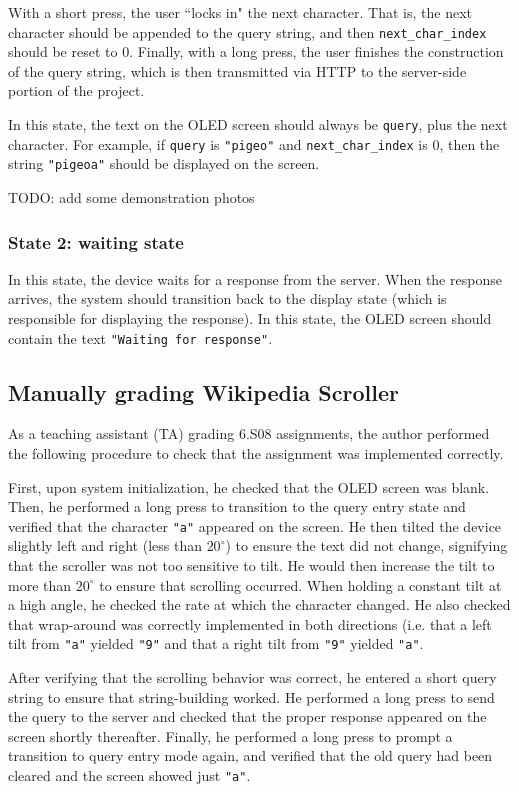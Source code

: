 \documentclass[12pt]{article}
\begin{document}
With a short press, the user ``locks in" the next character.  That is, the next character should be appended to the query string, and then \texttt{next_char_index} should be reset to 0.  Finally, with a long press, the user finishes the construction of the query string, which is then transmitted via HTTP to the server-side portion of the project.

In this state, the text on the OLED screen should always be \texttt{query}, plus the next character.  For example, if \texttt{query} is \texttt{"pigeo"} and \texttt{next_char_index} is 0, then the string \texttt{"pigeoa"} should be displayed on the screen.

TODO: add some demonstration photos

\subsubsection{State 2: waiting state}
In this state, the device waits for a response from the server.  When the response arrives, the system should transition back to the display state (which is responsible for displaying the response).  In this state, the OLED screen should contain the text \texttt{"Waiting for response"}.

\subsection{Manually grading Wikipedia Scroller}
As a teaching assistant (TA) grading 6.S08 assignments, the author performed the following procedure to check that the assignment was implemented correctly.

First, upon system initialization, he checked that the OLED screen was blank.  Then, he performed a long press to transition to the query entry state and verified that the character \texttt{"a"} appeared on the screen.  He then tilted the device slightly left and right (less than $20^{\circ}$) to ensure the text did not change, signifying that the scroller was not too sensitive to tilt.  He would then increase the tilt to more than $20^{\circ}$ to ensure that scrolling occurred.  When holding a constant tilt at a high angle, he checked the rate at which the character changed.  He also checked that wrap-around was correctly implemented in both directions (i.e. that a left tilt from \texttt{"a"} yielded \texttt{"9"} and that a right tilt from \texttt{"9"} yielded \texttt{"a"}.

After verifying that the scrolling behavior was correct, he entered a short query string to ensure that string-building worked.  He performed a long press to send the query to the server and checked that the proper response appeared on the screen shortly thereafter.  Finally, he performed a long press to prompt a transition to query entry mode again, and verified that the old query had been cleared and the screen showed just \texttt{"a"}.
\end{document}
